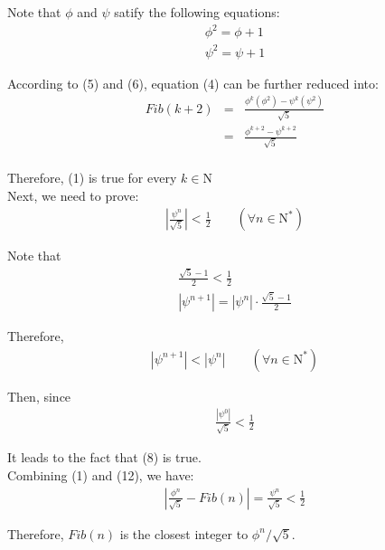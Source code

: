 \documentclass{article}
\begin{document}
    \noindent
    Note that $\phi$ and $\psi$ satify the following equations:
    \begin{eqnarray}
        \phi^{2} = \phi + 1 \\
        \psi^{2} = \psi + 1 
    \end{eqnarray}


    \noindent
    According to (5) and (6), equation (4) can be further reduced into:
    \begin{eqnarray}
        Fib(k + 2) &=& \frac{\phi^{k}(\phi^{2}) 
                       - \psi^{k}(\psi^{2})}{\sqrt{5}} \nonumber \\
                   &=& \frac{\phi^{k + 2} - \psi^{k + 2}}{\sqrt{5}} \nonumber \\
    \end{eqnarray}

    \noindent
    Therefore, (1) is true for every $k \in \mathrm{N}$\\

    \noindent
    Next, we need to prove:
    \begin{eqnarray}
        |\frac{\psi^{n}}{\sqrt{5}}| < \frac{1}{2} \qquad(\forall n \in \mathrm{N^{*}})
    \end{eqnarray}
    

    \noindent
    Note that
    \begin{eqnarray}
        \frac{\sqrt{5} - 1}{2} < \frac{1}{2} \\
        |\psi^{n + 1}| = |\psi^{n}|\cdot \frac{\sqrt{5} - 1}{2}
    \end{eqnarray}

    \noindent
    Therefore, 
    \begin{eqnarray}
        |\psi^{n + 1}| < |\psi^{n}| \qquad(\forall n \in \mathrm{N^{*}})
    \end{eqnarray}


    \noindent
    Then, since
    \begin{eqnarray}
        \frac{|\psi^{0}|}{\sqrt{5}} < \frac{1}{2}
    \end{eqnarray}


    \noindent
    It leads to the fact that (8) is true.\\

    \noindent
    Combining (1) and (12), we have:
    \begin{eqnarray}
        |\frac{\phi^{n}}{\sqrt{5}} - Fib(n)| = \frac{\psi^{n}}{\sqrt{5}} 
        < \frac{1}{2}
    \end{eqnarray}

    \noindent
    Therefore, $Fib(n)$ is the closest integer to $\phi^{n} / \sqrt{5}$.\\

    \noindent

        
\end{document}
